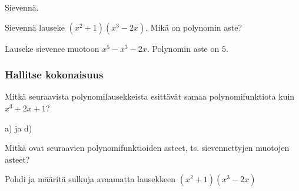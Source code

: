 \begin{tehtavasivu}
\begin{tehtava}
    Sievennä.
    \begin{vastaus}
    \end{vastaus}
\end{tehtava}

\begin{tehtava}
    Sievennä lauseke $(x^2+1)(x^3-2x)$. Mikä on polynomin aste?
    \begin{vastaus}
        Lauseke sievenee muotoon $x^5-x^3-2x$. Polynomin aste on $5$.
    \end{vastaus}
\end{tehtava}

\subsubsection*{Hallitse kokonaisuus}

\begin{tehtava}
	Mitkä seuraavista polynomilausekkeista esittävät samaa polynomifunktiota kuin
	$x^3+2x+1$?
	\begin{vastaus}
		a) ja d)
	\end{vastaus}
\end{tehtava}

\begin{tehtava}
	Mitkä ovat seuraavien polynomifunktioiden asteet, ts. sievennettyjen muotojen asteet?
	\begin{vastaus}
	\end{vastaus}
\end{tehtava}

\begin{tehtava}
    Pohdi ja määritä sulkuja avaamatta lausekkeen $(x^2+1)(x^3-2x)$
    \begin{vastaus}
    \end{vastaus}
\end{tehtava}


\end{tehtavasivu}
